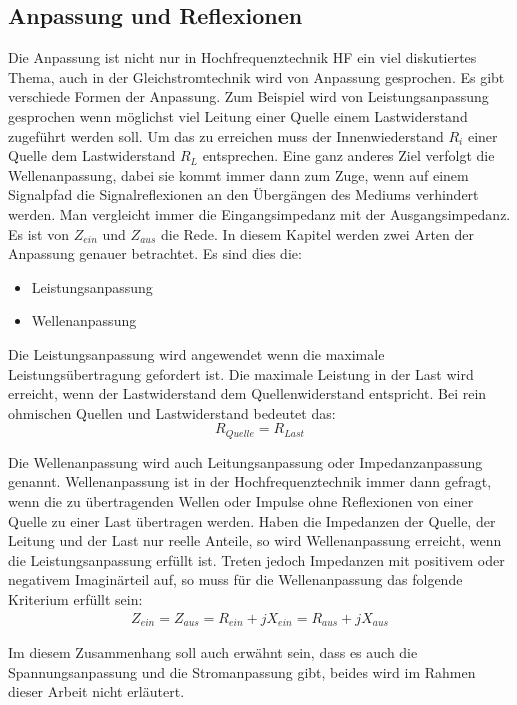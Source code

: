 \subsection{Anpassung und Reflexionen}
Die Anpassung ist nicht nur in Hochfrequenztechnik HF ein viel diskutiertes Thema, auch in der Gleichstromtechnik wird von Anpassung gesprochen. Es gibt verschiede Formen der Anpassung. Zum Beispiel wird von Leistungsanpassung gesprochen wenn möglichst viel Leitung einer Quelle einem Lastwiderstand zugeführt werden soll. Um das zu erreichen muss der Innenwiederstand  $R_i$ einer Quelle dem Lastwiderstand $R_L$ entsprechen.  Eine ganz anderes Ziel verfolgt die Wellenanpassung, dabei sie kommt immer dann zum Zuge, wenn auf einem Signalpfad die Signalreflexionen an den Übergängen des Mediums verhindert werden.
Man vergleicht immer die Eingangsimpedanz mit der Ausgangsimpedanz. Es ist  von $Z_{ein}$ und $Z_{aus}$ die Rede.
In diesem Kapitel werden zwei Arten der Anpassung genauer betrachtet. Es sind dies die:
\begin{itemize}
\item Leistungsanpassung
\item Wellenanpassung
\end{itemize}
Die Leistungsanpassung wird angewendet wenn die maximale Leistungsübertragung gefordert ist. Die maximale Leistung in der Last wird erreicht, wenn der Lastwiderstand dem Quellenwiderstand entspricht. Bei rein ohmischen Quellen und Lastwiderstand bedeutet das:\\
\[R_{Quelle} = R_{Last}\]

Die Wellenanpassung wird auch Leitungsanpassung oder Impedanzanpassung genannt. Wellenanpassung ist in der Hochfrequenztechnik immer dann gefragt, wenn die zu übertragenden Wellen oder Impulse ohne Reflexionen von einer Quelle zu einer Last übertragen werden. Haben die Impedanzen der Quelle, der Leitung und der Last nur reelle Anteile, so wird Wellenanpassung erreicht, wenn die Leistungsanpassung erfüllt ist. Treten jedoch Impedanzen mit positivem oder negativem Imaginärteil auf, so muss für die Wellenanpassung das folgende Kriterium erfüllt sein: \\
\begin{eqnarray}\label{eq:ZeinZaus}
Z_{ein} = Z_{aus} = R_{ein} +jX_{ein} = R_{aus} + jX_{aus}
\end{eqnarray}

Im diesem Zusammenhang soll auch erwähnt sein, dass es auch die Spannungsanpassung und die Stromanpassung gibt, beides wird im Rahmen dieser Arbeit nicht erläutert. \\

